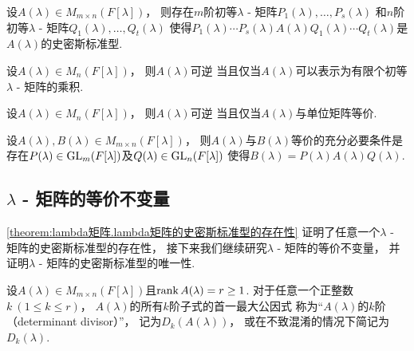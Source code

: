 \begin{corollary}
设\(A(\lambda) \in M_{m \times n}(F[\lambda])\)，
则存在\(m\)阶初等\(\lambda\) - 矩阵\(P_1(\lambda),\dotsc,P_s(\lambda)\)
和\(n\)阶初等\(\lambda\) - 矩阵\(Q_1(\lambda),\dotsc,Q_t(\lambda)\)
使得\(
	P_1(\lambda) \dotsm P_s(\lambda)
	A(\lambda)
	Q_1(\lambda) \dotsm Q_t(\lambda)
\)是\(A(\lambda)\)的史密斯标准型.
\end{corollary}

\begin{corollary}
设\(A(\lambda) \in M_n(F[\lambda])\)，
则\(A(\lambda)\)可逆
当且仅当\(A(\lambda)\)可以表示为有限个初等\(\lambda\) - 矩阵的乘积.
\end{corollary}

\begin{corollary}
设\(A(\lambda) \in M_n(F[\lambda])\)，
则\(A(\lambda)\)可逆
当且仅当\(A(\lambda)\)与单位矩阵等价.
\end{corollary}

\begin{corollary}
设\(A(\lambda), B(\lambda) \in M_{m \times n}(F[\lambda])\)，
则\(A(\lambda)\)与\(B(\lambda)\)等价的充分必要条件是
存在\(P(\lambda) \in \operatorname{GL}_m(F[\lambda])\)及\(Q(\lambda) \in \operatorname{GL}_n(F[\lambda])\)
使得\(
	B(\lambda)
	= P(\lambda) A(\lambda) Q(\lambda)
\).
\end{corollary}

\subsection{\texorpdfstring{$\lambda$}{\textlambda} - 矩阵的等价不变量}
\cref{theorem:lambda矩阵.lambda矩阵的史密斯标准型的存在性}
证明了任意一个\(\lambda\) - 矩阵的史密斯标准型的存在性，
接下来我们继续研究\(\lambda\) - 矩阵的等价不变量，
并证明\(\lambda\) - 矩阵的史密斯标准型的唯一性.

\begin{definition}
设\(A(\lambda) \in M_{m \times n}(F[\lambda])\)且\(\rank A(\lambda) = r \geq 1\).
对于任意一个正整数\(k\ (1 \leq k \leq r)\)，
\(A(\lambda)\)的所有\(k\)阶子式的首一最大公因式
称为“\(A(\lambda)\)的\(k\)阶（determinant divisor）”，
记为\(D_k(A(\lambda))\)，
或在不致混淆的情况下简记为\(D_k(\lambda)\).
\end{definition}

